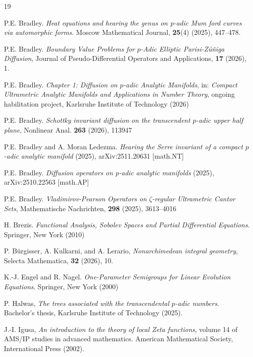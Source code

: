 \documentclass[a4paper,draft]{ZbRad}
\theoremstyle{plain}
\theoremstyle{definition}
\numberwithin{equation}{section}
\begin{document}
\begin{thebibliography}{19} %

P.E. Bradley. \emph{Heat equations and hearing the genus on p-adic Mum
ford curves via automorphic forms}. Moscow Mathematical Journal,
{\bf 25}(4) (2025), 447--478.

P.E. Bradley. \emph{Boundary Value Problems for $p$-Adic Elliptic Parisi-Zúñiga Diffusion}, Journal of Pseudo-Differential Operators and Applications, \textbf{17} (2026), 1.

P.E. Bradley. \emph{Chapter 1: Diffusion on $p$-adic Analytic Manifolds}, in: \emph{Compact Ultrametric Analytic Manifolds and Applications in
Number Theory}, ongoing habilitation project, Karls\-ruhe Institute of Technology (2026)

P.E. Bradley. \emph{Schottky invariant diffusion on the transcendent $p$-adic upper half
plane}, Nonlinear Anal. \textbf{263} (2026), 113947

P.E. Bradley and A. Moran Ledezma. \emph{Hearing the Serre invariant of a compact $p$-adic analytic manifold} (2025), arXiv:2511.20631 [math.NT]

P.E. Bradley. \emph{Diffusion operators on p-adic analytic manifolds} (2025), arXiv:2510.22563 [math.AP]

P.E. Bradley. \emph{Vladimirov-Pearson Operators on $\zeta$-regular Ultrametric Cantor Sets},
Mathematische Nachrichten, \textbf{298} (2025), 3613--4016

H. Brezis. \emph{Functional Analysis, Sobolev Spaces and Partial Diﬀerential
Equations}. Springer, New York (2010)

P. Bürgisser, A. Kulkarni, and A. Lerario, \emph{Nonarchimedean integral
geometry}, Selecta Mathematica, \textbf{32} (2026), 10.

K.-J. Engel and R. Nagel. \emph{One-Parameter Semigroups for Linear Evolution
Equations}. Springer, New York (2000)

P. Halwas, \emph{The trees associated with the transcendental $p$-adic numbers}.
Bachelor’s thesis, Karlsruhe Institute of Technology (2025).

J.-I. Igusa, \emph{An introduction to the theory of local Zeta functions}, volume 14
of AMS/IP studies in advanced mathematics. American Mathematical
Society, International Press (2002).


\end{thebibliography}
\end{document}
